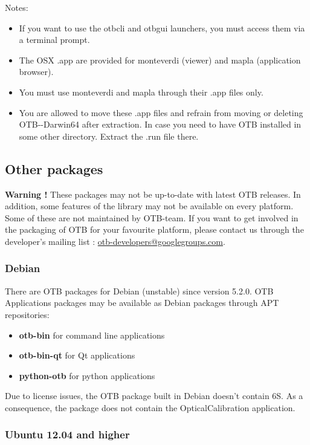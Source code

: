 Notes:
\begin{itemize}
\item If you want to use the otbcli and otbgui launchers, you must access them via a terminal prompt.
\item The OSX .app are provided for monteverdi (viewer) and mapla (application browser).
\item You must use monteverdi and mapla through their .app files only.
\item You are allowed to move these .app files and refrain from moving or deleting OTB-\otbversion-Darwin64 after extraction.
In case you need to have OTB installed in some other directory. Extract the .run file there.
\end{itemize}

\subsection{Other packages}

\textbf{Warning !} These packages may not be up-to-date with latest OTB releases.
In addition, some features of the library may not be available on every platform.
Some of these are not maintained by OTB-team. If you want to get involved in
the packaging of OTB for your favourite platform, please contact us through the developer's
mailing list :
\href{mailto:otb-developers@googlegroups.com}{otb-developers@googlegroups.com}.

\subsubsection{Debian}
There are OTB packages for Debian (unstable) since version 5.2.0.
OTB Applications packages may be available as
Debian packages through APT repositories:
\begin{itemize}
\item \textbf{otb-bin} for command line applications
\item \textbf{otb-bin-qt} for Qt applications
\item \textbf{python-otb} for python applications
\end{itemize}

Due to license issues, the OTB package built in Debian doesn't contain 6S. As
a consequence, the package does not contain the OpticalCalibration application.

\subsubsection{Ubuntu 12.04 and higher}


